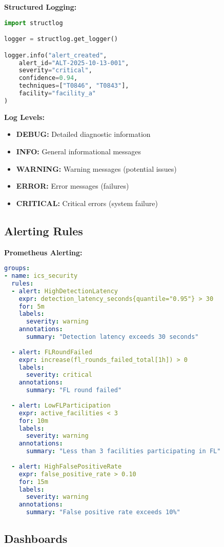 \documentclass[12pt,a4paper]{article}
\begin{document}
\textbf{Structured Logging:}
\begin{lstlisting}[language=python]
import structlog

logger = structlog.get_logger()

logger.info("alert_created",
    alert_id="ALT-2025-10-13-001",
    severity="critical",
    confidence=0.94,
    techniques=["T0846", "T0843"],
    facility="facility_a"
)
\end{lstlisting}

\textbf{Log Levels:}
\begin{itemize}[leftmargin=1cm,itemsep=0pt]
    \item \textbf{DEBUG:} Detailed diagnostic information
    \item \textbf{INFO:} General informational messages
    \item \textbf{WARNING:} Warning messages (potential issues)
    \item \textbf{ERROR:} Error messages (failures)
    \item \textbf{CRITICAL:} Critical errors (system failure)
\end{itemize}

\subsection{Alerting Rules}

\textbf{Prometheus Alerting:}
\begin{lstlisting}[language=yaml]
groups:
- name: ics_security
  rules:
  - alert: HighDetectionLatency
    expr: detection_latency_seconds{quantile="0.95"} > 30
    for: 5m
    labels:
      severity: warning
    annotations:
      summary: "Detection latency exceeds 30 seconds"
  
  - alert: FLRoundFailed
    expr: increase(fl_rounds_failed_total[1h]) > 0
    labels:
      severity: critical
    annotations:
      summary: "FL round failed"
  
  - alert: LowFLParticipation
    expr: active_facilities < 3
    for: 10m
    labels:
      severity: warning
    annotations:
      summary: "Less than 3 facilities participating in FL"
  
  - alert: HighFalsePositiveRate
    expr: false_positive_rate > 0.10
    for: 15m
    labels:
      severity: warning
    annotations:
      summary: "False positive rate exceeds 10%"
\end{lstlisting}

\subsection{Dashboards}
\end{document}
